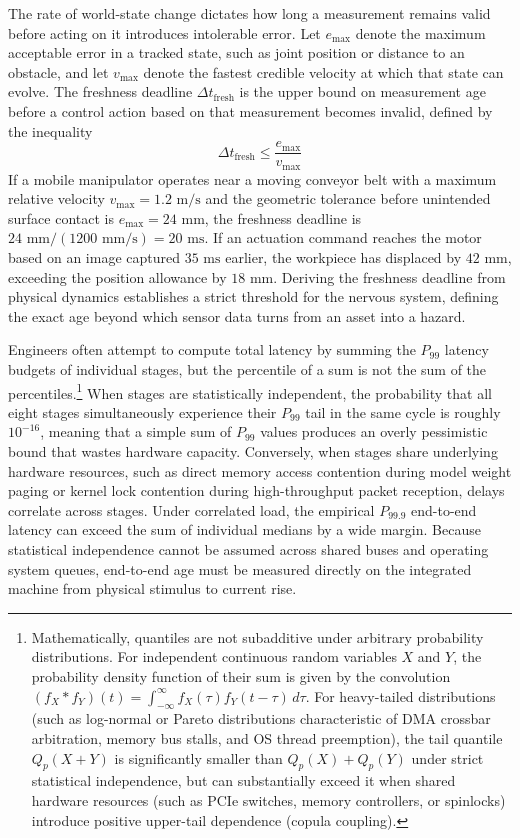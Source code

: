 \documentclass[
  letterpaper,
  DIV=11,
  numbers=noendperiod]{scrartcl}
\begin{document}
The rate of world-state change dictates how long a measurement remains
valid before acting on it introduces intolerable error. Let \(e_{\max}\)
denote the maximum acceptable error in a tracked state, such as joint
position or distance to an obstacle, and let \(v_{\max}\) denote the
fastest credible velocity at which that state can evolve. The freshness
deadline \(\Delta t_{\text{fresh}}\) is the upper bound on measurement
age before a control action based on that measurement becomes invalid,
defined by the inequality
\[\Delta t_{\text{fresh}} \le \frac{e_{\max}}{v_{\max}}\] If a mobile
manipulator operates near a moving conveyor belt with a maximum relative
velocity \(v_{\max} = 1.2\text{ m/s}\) and the geometric tolerance
before unintended surface contact is \(e_{\max} = 24\text{ mm}\), the
freshness deadline is
\(24\text{ mm} / (1200\text{ mm/s}) = 20\text{ ms}\). If an actuation
command reaches the motor based on an image captured \(35\text{ ms}\)
earlier, the workpiece has displaced by \(42\text{ mm}\), exceeding the
position allowance by \(18\text{ mm}\). Deriving the freshness deadline
from physical dynamics establishes a strict threshold for the nervous
system, defining the exact age beyond which sensor data turns from an
asset into a hazard.

Engineers often attempt to compute total latency by summing the
\(P_{99}\) latency budgets of individual stages, but the percentile of a
sum is not the sum of the percentiles.\footnote{Mathematically,
  quantiles are not subadditive under arbitrary probability
  distributions. For independent continuous random variables \(X\) and
  \(Y\), the probability density function of their sum is given by the
  convolution
  \((f_X * f_Y)(t) = \int_{-\infty}^\infty f_X(\tau) f_Y(t - \tau) \, d\tau\).
  For heavy-tailed distributions (such as log-normal or Pareto
  distributions characteristic of DMA crossbar arbitration, memory bus
  stalls, and OS thread preemption), the tail quantile \(Q_p(X + Y)\) is
  significantly smaller than \(Q_p(X) + Q_p(Y)\) under strict
  statistical independence, but can substantially exceed it when shared
  hardware resources (such as PCIe switches, memory controllers, or
  spinlocks) introduce positive upper-tail dependence (copula coupling).}
When stages are statistically independent, the probability that all
eight stages simultaneously experience their \(P_{99}\) tail in the same
cycle is roughly \(10^{-16}\), meaning that a simple sum of \(P_{99}\)
values produces an overly pessimistic bound that wastes hardware
capacity. Conversely, when stages share underlying hardware resources,
such as direct memory access contention during model weight paging or
kernel lock contention during high-throughput packet reception, delays
correlate across stages. Under correlated load, the empirical
\(P_{99.9}\) end-to-end latency can exceed the sum of individual medians
by a wide margin. Because statistical independence cannot be assumed
across shared buses and operating system queues, end-to-end age must be
measured directly on the integrated machine from physical stimulus to
current rise.
\end{document}
